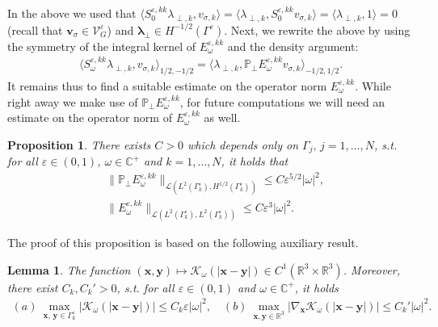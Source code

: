 \documentclass[]{article}
\newtheorem{lemma}{Lemma}
\newtheorem{proposition}{Proposition}
\numberwithin{equation}{section}
\numberwithin{theorem}{section}
\numberwithin{lemma}{section}
\numberwithin{corollary}{section}
\numberwithin{proposition}{section}
\numberwithin{definition}{section}
\newcommand{\bx}{\boldsymbol{x}}
\newcommand{\by}{\boldsymbol{y}}
\newcommand{\re}{\varepsilon}
\renewcommand{\vec}{\boldsymbol}
\begin{document}
	In the above we used that $\langle S_0^{\re,kk}\lambda_{\perp,k}, v_{\sigma,k}\rangle=\langle \lambda_{\perp,k}, S_0^{\re,kk}v_{\sigma,k}\rangle=\langle \lambda_{\perp,k},1\rangle=0$ (recall that $\vec{v}_{\sigma}\in \mathcal{V}_{G}^{\re}$) and $\vec{\lambda}_{\perp}\in H^{-1/2}(\Gamma^{\re})$. Next, we rewrite the above by using the symmetry of the integral kernel of $E_{\omega}^{\re,kk}$ and the density argument: 
	\begin{align}
		\label{eq:key_ident}
		\langle  S^{\re,kk}_{\omega} \lambda_{\perp,k}, v_{\sigma,k}\rangle_{1/2, -1/2}=	\langle \lambda_{\perp,k}, \mathbb{P}_{\perp}E_{\omega}^{\re,kk}v_{\sigma,k}\rangle_{-1/2,1/2}.	
	\end{align}
	It remains thus to find a suitable estimate on the operator norm $E^{\re,kk}_{\omega}$. While right away we make use of $\mathbb{P}_{\perp}E_{\omega}^{\re,kk}$, for future computations we will need an estimate on the operator norm of $E_{\omega}^{\re,kk}$ as well. 	
	\begin{proposition}
		\label{prop:Ekk}
		There exists $C>0$ which depends only on $\Gamma_j, \, j=1,\ldots,N$, s.t. for all $\re\in (0,1)$, $\omega \in \mathbb{C}^+$ and $k=1,\ldots, N$, it holds that 
		\begin{align}
			\label{eq:pe}
			&\|\mathbb{P}_{\perp}E^{\re,kk}_{\omega} \|_{\mathcal{L}(L^2(\Gamma^{\re}_k),H^{1/2}(\Gamma^{\re}_k))} \leq C \re^{5/2} |\omega|^2,\\
			\label{eq:pel2}
			&\|E^{\re,kk}_{\omega} \|_{\mathcal{L}(L^2(\Gamma^{\re}_k),L^2(\Gamma^{\re}_k))} \leq C \re^{3} |\omega|^2.
		\end{align}
	\end{proposition}
	The proof of this proposition is based on the following auxiliary result. 
	\begin{lemma}
		\label{lemma:kernel_bound}
		The function $(\vec{x}, \vec{y})\mapsto \mathcal{K}_{\omega}(|\bx-\by|)\in C^1(\mathbb{R}^3\times\mathbb{R}^3)$. 
		Moreover, there exist $C_k, C_k'>0$, s.t. for all $\re \in (0,1)$ and $\omega\in \mathbb{C}^+$, it holds 
		\begin{align}
			\label{eq:Kbound}	
			(a)~\max_{\vec{x}, \, \vec{y}\in \Gamma^{\re}_k}|\mathcal{K}_{\omega}(|\vec{x}-\vec{y}|)|\leq C_k\varepsilon|\omega|^2,\quad
			(b)	~ \max_{\vec{x}, \vec{y}\in \mathbb{R}^3}|\nabla_{\vec{x}}\mathcal{K}_{\omega}(|\vec{x}-\vec{y}|)|\leq C_k'|\omega|^2.
		\end{align}
	\end{lemma}
\end{document}
